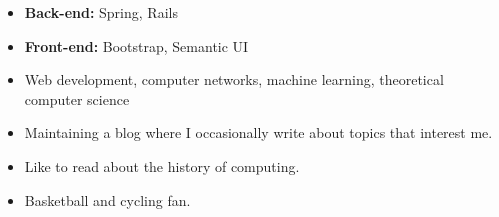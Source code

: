 \documentclass[10pt,a4paper,ragged2e]{altacv}
\begin{document}
\begin{itemize}
\item \textbf{Back-end: }Spring, Rails
\item \textbf{Front-end: }Bootstrap, Semantic UI
\end{itemize}

\begin{itemize}
\item Web development, computer networks, machine learning, theoretical computer science
\end{itemize}



\begin{itemize}
\item Maintaining a blog where I occasionally write about topics that interest me.
\item Like to read about the history of computing.
\item Basketball and cycling fan.
\end{itemize}

\clearpage

\nocite{*}
\end{document}
